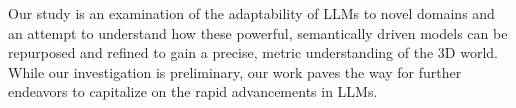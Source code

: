 Our study is an examination of the adaptability of LLMs to novel domains and an attempt to understand how these powerful, semantically driven models can be repurposed and refined to gain a precise, metric understanding of the 3D world.
While our investigation is preliminary, our work paves the way for further endeavors to capitalize on the rapid advancements in LLMs.